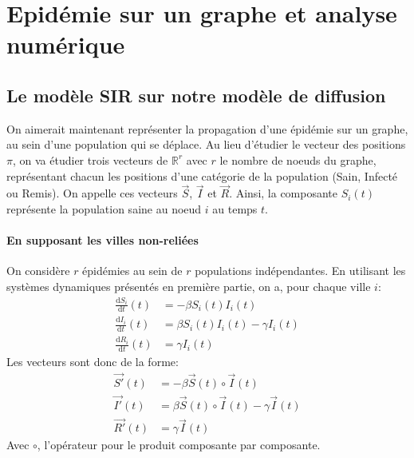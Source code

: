 \documentclass[a4paper]{article}
\theoremstyle{plain}
\theoremstyle{definition}
\theoremstyle{remark}
\begin{document}
\section{Epidémie sur un graphe et analyse numérique}
\subsection{Le modèle SIR sur notre modèle de diffusion}
On aimerait maintenant représenter la propagation d'une épidémie sur un graphe, au sein d'une population qui se déplace. Au lieu d'étudier le vecteur des positions $\pi$, on va étudier trois vecteurs de $\mathbb{R}^r$ avec $r$ le nombre de noeuds du graphe, représentant chacun les positions d'une catégorie de la population (Sain, Infecté ou Remis). On appelle ces vecteurs $\vec{S}$, $\vec{I}$ et $\vec{R}$. Ainsi, la composante $S_i(t)$ représente la population saine au noeud $i$ au temps $t$.
\paragraph{En supposant les villes non-reliées} On considère $r$ épidémies au sein de $r$ populations indépendantes. En utilisant les systèmes dynamiques présentés en première partie, on a, pour chaque ville $i$:
\begin{align}
    \frac{\mathrm{d}S_i}{\mathrm{d}t}(t)&=-\beta S_i(t)I_i(t)\\
    \frac{\mathrm{d}I_i}{\mathrm{d}t}(t)&=\beta S_i(t)I_i(t)-\gamma I_i(t)\\
    \frac{\mathrm{d}R_i}{\mathrm{d}t}(t)&=\gamma I_i(t)
\end{align}
Les vecteurs sont donc de la forme:
\begin{align}
    \vec{S'}(t)&=-\beta \vec{S}(t)\circ\vec{I}(t)\\
   \vec{I'}(t)&=\beta \vec{S}(t)\circ\vec{I}(t)-\gamma \vec{I}(t)\\
    \vec{R'}(t)&=\gamma \vec{I}(t)
\end{align}
Avec $\circ$, l'opérateur pour le produit composante par composante.
\end{document}
